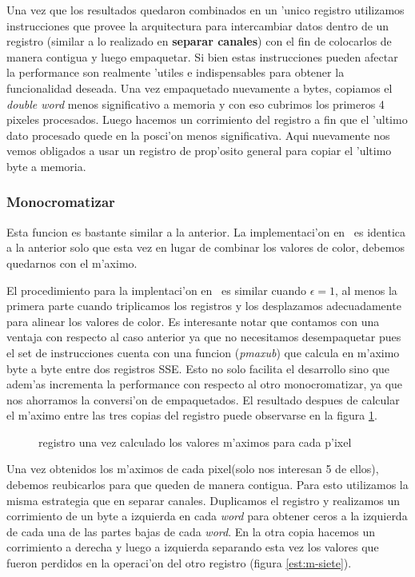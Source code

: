 Una vez que los resultados quedaron combinados en un 'unico registro utilizamos instrucciones que provee la arquitectura para intercambiar datos dentro de un registro (similar a lo realizado en \textbf{separar canales}) con el fin de colocarlos de manera contigua y luego empaquetar. Si bien 
estas instrucciones pueden afectar la performance son realmente  'utiles e indispensables para obtener la funcionalidad deseada. Una vez empaquetado nuevamente a bytes, copiamos el \textit{double word} menos significativo a memoria y con eso cubrimos los primeros 4 pixeles procesados.
Luego hacemos un corrimiento del registro a fin que el 'ultimo dato procesado quede en la posci'on menos significativa. Aqui nuevamente nos vemos obligados a usar un registro de prop'osito general para copiar el 'ultimo byte a memoria.

\subsubsection{Monocromatizar \protect{$\epsilon = \infty $} }
Esta funcion es bastante similar a la anterior. La implementaci'on en \C\ es identica a la anterior solo que esta vez en lugar de combinar los valores de color, debemos quedarnos con el m'aximo.

El procedimiento para la implentaci'on en \ass\ es similar cuando  $\epsilon= 1$, al menos la primera parte cuando triplicamos los registros y los desplazamos adecuadamente para alinear los valores de color. Es interesante notar que contamos con una ventaja con respecto al caso anterior ya que no necesitamos desempaquetar pues el set de instrucciones cuenta con una funcion (\textit{pmaxub}) que calcula en m'aximo byte a byte entre dos registros SSE. Esto no solo facilita el desarrollo sino que adem'as incrementa la performance con respecto al otro monocromatizar, ya que nos ahorramos la conversi'on de empaquetados. El resultado despues de calcular el m'aximo entre las tres copias del registro puede observarse en la figura \ref{est:m-seis}.

\begin{figure}[h!]
\caption{registro una vez calculado los valores m'aximos para cada p'ixel}
\label{est:m-seis}
\end{figure}

Una vez obtenidos los m'aximos de cada pixel(solo nos interesan 5 de ellos), debemos reubicarlos para que queden de manera contigua. Para esto utilizamos la misma estrategia que en separar canales. Duplicamos el registro y realizamos un corrimiento de un byte a izquierda en cada \textit{word} para obtener ceros a la izquierda de cada una de las partes bajas de cada \textit{word}. En la otra copia hacemos un corrimiento a derecha y luego a izquierda separando esta vez los valores que fueron perdidos en la operaci'on del otro registro (figura \ref{est:m-siete}). 


